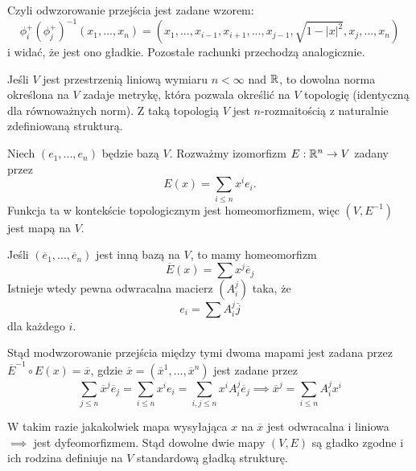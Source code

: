\begin{example}
\begin{figure}[h!]
{
  }
  \end{figure}

  \begin{center}\end{center}
  Czyli odwzorowanie przejścia jest zadane wzorem:
  $$\phi_i^+(\phi_j^+)^{-1}(x_1,...,x_n)=(x_1,...,x_{i-1},x_{i+1},...,x_{j-1},\sqrt{1-|x|^2},x_j,...,x_n)$$
  i widać, że jest ono gładkie. Pozostałe rachunki przechodzą analogicznie.

    \item Jeśli $V$ jest przestrzenią liniową wymiaru $n<\infty$ nad $\mathbb{R}$, to dowolna norma określona na $V$ zadaje metrykę, która pozwala określić na $V$ topologię (identyczną dla równoważnych norm). Z taką topologią $V$ jest $n$-rozmaitością z naturalnie zdefiniowaną strukturą.

      Niech $(e_1,...,e_n)$ będzie bazą $V$. Rozważmy izomorfizm $E:\mathbb{R}^n\to V$ zadany przez
      $$E(x)=\sum_{i\leq n}x^ie_i.$$
      Funkcja ta w kontekście topologicznym jest homeomorfizmem, więc $(V, E^{-1})$ jest mapą na $V$. 

      Jeśli $(\overline{e}_1,...,\overline{e}_n)$ jest inną bazą na $V$, to mamy homeomorfizm 
      $$\overline{E}(x)=\sum x^j\overline{e}_j$$ 
      Istnieje wtedy pewna odwracalna macierz $(A_i^j)$ taka, że 
      $$e_i=\sum A^j_i\overline{j}$$ 
      dla każdego $i$. 

      Stąd modwzorowanie przejścia między tymi dwoma mapami jest zadana przez $\overline{E}^{-1}\circ E(x)=\overline{x}$, gdzie $\overline{x}=(\overline{x}^1,...,\overline{x}^n)$ jest zadane przez
      $$\sum_{j\leq n}\overline{x}^j\overline{e}_j=\sum_{i\leq n}x^ie_i=\sum_{i,j\leq n} x^iA_i^j\overline{e}_j\implies \overline{x}^j=\sum_{i\leq n} A_i^jx^i$$

      W takim razie jakakolwiek mapa wysyłająca $x$ na $\overline{x}$ jest odwracalna i liniowa $\implies$ jest dyfeomorfizmem. Stąd dowolne dwie mapy $(V, E)$ są gładko zgodne i ich rodzina definiuje na $V$ standardową gładką strukturę.
\end{example}

